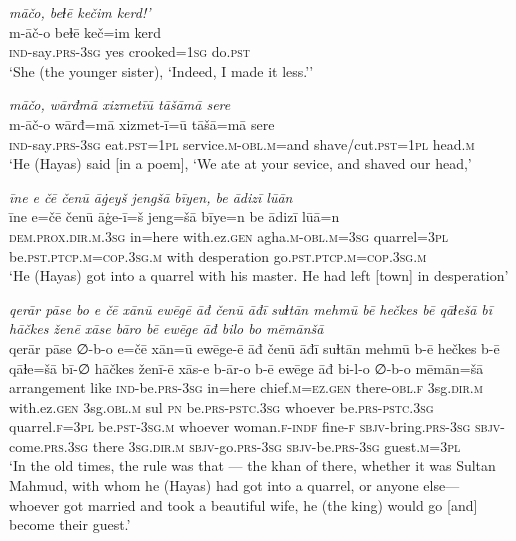 \ea \label{ŽH.49}
\textit{māčo, beɫē kečim kerd!’} \\ 
\gll m-āč-o beɫē keč=im kerd \\ 
 \textsc{ind-}say\textsc{.prs}\textsc{-3sg} yes crooked\textsc{=1sg} do\textsc{.pst} \\ 
\glt `She (the younger sister), ‘Indeed, I made it less.’'
\z 
 
\ea \label{ŽH.55}
\textit{māčo, wārđmā xizmetīū tāšāmā sere} \\ 
\gll m-āč-o wārđ=mā xizmet-ī=ū tāšā=mā sere \\ 
 \textsc{ind-}say\textsc{.prs}\textsc{-3sg} eat\textsc{.pst}\textsc{=1pl} service\textsc{.m}\textsc{-obl}\textsc{.m}=and shave/cut\textsc{.pst}\textsc{=1pl} head\textsc{.m} \\ 
\glt `He (Hayas) said [in a poem], ‘We ate at your sevice, and shaved our head,'
\z 
 
\ea \label{ŽH.62}
\textit{īne e čē čenū āġeyš jengšā bīyen, be ādizī lūān} \\ 
\gll īne e=čē čenū āġe-ī=š jeng=šā bīye=n be ādizī lūā=n \\ 
 \textsc{dem.prox}\textsc{.dir}\textsc{.m}\textsc{.3sg} in=here with.ez\textsc{.gen} agha\textsc{.m}\textsc{-obl}\textsc{.m}\textsc{=3sg} quarrel\textsc{=3pl} be\textsc{.pst}\textsc{.ptcp}\textsc{.m}\textsc{=cop}\textsc{.3sg}\textsc{.m} with desperation go\textsc{.pst}\textsc{.ptcp}\textsc{.m}\textsc{=cop}\textsc{.3sg}\textsc{.m} \\ 
\glt `He (Hayas) got into a quarrel with his master. He had left [town] in desperation'
\z 
 
\ea \label{ŽH.64}
\textit{qerār pāse bo e čē xānū ewēgē āđ čenū āđī suɫtān mehmū bē hečkes bē qāɫešā bī hāčkes ženē xāse bāro bē ewēge āđ bilo bo mēmānšā} \\ 
\gll qerār pāse ∅-b-o e=čē xān=ū ewēge-ē āđ čenū āđī suɫtān mehmū b-ē hečkes b-ē qāɫe=šā bī-∅ hāčkes ženī-ē xās-e b-ār-o b-ē ewēge āđ bi-l-o ∅-b-o mēmān=šā \\ 
 arrangement like \textsc{ind-}be\textsc{.prs}\textsc{-3sg} in=here chief\textsc{.m}\textsc{=ez}\textsc{.gen} there\textsc{-obl}\textsc{\textsc{.f}} 3sg\textsc{.dir}\textsc{.m} with.ez\textsc{.gen} 3sg\textsc{.obl}\textsc{.m} sul \textsc{pn} be\textsc{.prs}\textsc{-pstc}\textsc{.3sg} whoever be\textsc{.prs}\textsc{-pstc}\textsc{.3sg} quarrel\textsc{\textsc{.f}}\textsc{=3pl} be\textsc{.pst}\textsc{-3sg}\textsc{.m} whoever woman\textsc{\textsc{.f}}\textsc{-indf} fine\textsc{-f} \textsc{sbjv-}bring\textsc{.prs}\textsc{-3sg} \textsc{sbjv-}come\textsc{.prs}\textsc{.3sg} there \textsc{3sg}\textsc{.dir}\textsc{.m} \textsc{sbjv-}go\textsc{.prs}\textsc{-3sg} \textsc{sbjv-}be\textsc{.prs}\textsc{-3sg} guest\textsc{.m}\textsc{=3pl} \\ 
\glt `In the old times, the rule was that — the khan of there, whether it was Sultan Mahmud, with whom he (Hayas) had got into a quarrel, or anyone else— whoever got married and took a beautiful wife, he (the king) would go [and] become their guest.'
\z 
 
